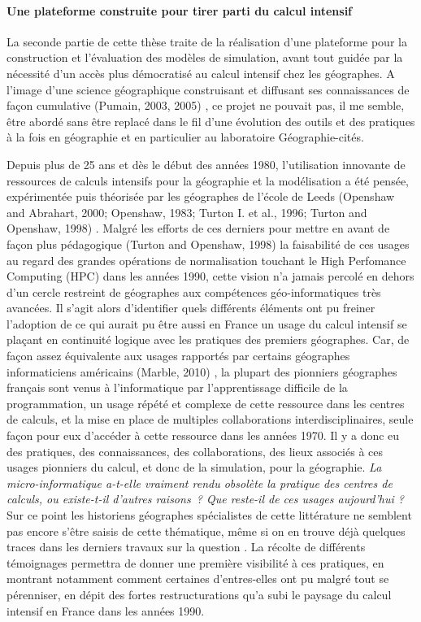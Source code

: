 \paragraph*{Une plateforme construite pour tirer parti du calcul intensif}

La seconde partie de cette thèse traite de la réalisation d'une plateforme pour la construction et l'évaluation des modèles de simulation, avant tout guidée par la nécessité d'un accès plus démocratisé au calcul intensif chez les géographes. A l'image d'une science géographique construisant et diffusant ses connaissances de façon cumulative (Pumain, 2003, 2005) %
⁠, ce projet ne pouvait pas, il me semble, être abordé sans être replacé dans le fil d'une évolution des outils et des pratiques à la fois en géographie et en particulier au laboratoire Géographie-cités.

Depuis plus de 25 ans et dès le début des années 1980, l'utilisation innovante de ressources de calculs intensifs pour la géographie et la modélisation a été pensée, expérimentée puis théorisée par les géographes de l'école de Leeds (Openshaw and Abrahart, 2000; Openshaw, 1983; Turton I. et al., 1996; Turton and Openshaw, 1998)%
⁠. Malgré les efforts de ces derniers pour mettre en avant de façon plus pédagogique (Turton and Openshaw, 1998)%
 la faisabilité de ces usages au regard des grandes opérations de normalisation touchant le High Perfomance Computing (HPC) dans les années 1990, cette vision n'a jamais percolé en dehors d'un cercle restreint de géographes aux compétences géo-informatiques très avancées. Il s'agit alors d'identifier quels différents éléments ont pu freiner l'adoption de ce qui aurait pu être aussi en France un usage du calcul intensif se plaçant en continuité logique avec les pratiques des premiers géographes. Car, de façon assez équivalente aux usages rapportés par certains géographes informaticiens américains (Marble, 2010)⁠%
 , la plupart des pionniers géographes français sont venus à l'informatique par l'apprentissage difficile de la programmation, un usage répété et complexe de cette ressource dans les centres de calculs, et la mise en place de multiples collaborations interdisciplinaires, seule façon pour eux d'accéder à cette ressource dans les années 1970. Il y a donc eu des pratiques, des connaissances, des collaborations, des lieux associés à ces usages pionniers du calcul, et donc de la simulation, pour la géographie. \textit{La micro-informatique a-t-elle vraiment rendu obsolète la pratique des centres de calculs, ou existe-t-il d'autres raisons ? Que reste-il de ces usages aujourd'hui ?} Sur ce point les historiens géographes spécialistes de cette littérature ne semblent pas encore s'être saisis de cette thématique, même si on en trouve déjà quelques traces dans les derniers travaux sur la question \autocite{Cuyala2014}⁠. La récolte de différents témoignages permettra de donner une première visibilité à ces pratiques, en montrant notamment comment certaines d'entres-elles ont pu malgré tout se pérenniser, en dépit des fortes restructurations qu'a subi le paysage du calcul intensif en France dans les années 1990.

